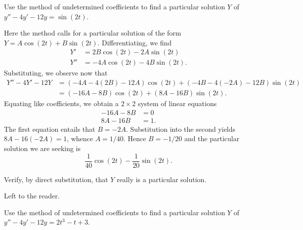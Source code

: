 \documentclass[answers,11pt]{exam}
\begin{document}
\begin{questions}
\question Use the method of undetermined coefficients to find a particular solution $Y$ of $y'' - 4y' - 12y = \sin{(2t)}$. 

\begin{solution}
	Here the method calls for a particular solution of the form $Y = A \cos{(2t)} + B \sin{(2t)}$. Differentiating, we find
    \begin{align*}
        Y' &= 2B \cos{(2t)} - 2A \sin{(2t)} \\
        Y'' &= -4A \cos{(2t)} - 4B \sin{(2t)}.
    \end{align*}
    Substituting, we observe now that
    \begin{align*}
        Y'' - 4Y' - 12Y &= (-4A - 4(2B) - 12A) \cos{(2t)} + (-4B - 4(-2A) - 12B) \sin{(2t)} \\
        &= (-16A - 8B) \cos{(2t)} + (8A - 16B) \sin{(2t)}.
    \end{align*}
    Equating like coefficients, we obtain a $2 \times 2$ system of linear equations
    \begin{align*}  
        -16 A - 8 B &= 0 \\
        8A - 16B &= 1.
    \end{align*}
    The first equation entails that $B = -2A$. Substitution into the second yields $8A - 16(-2A) = 1$, whence $A = 1/40$. Hence $B = -1/20$ and the particular solution we are seeking is
    \[
        \frac{1}{40} \cos{(2t)} - \frac{1}{20} \sin{(2t)}.
    \]
\end{solution}

\question Verify, by direct substitution, that $Y$ really is a particular solution.

\begin{solution}
	Left to the reader.
\end{solution}

\question Use the method of undetermined coefficients to find a particular solution $Y$ of $y'' - 4y' - 12y = 2t^3 - t + 3$.


\end{questions}
\end{document}
